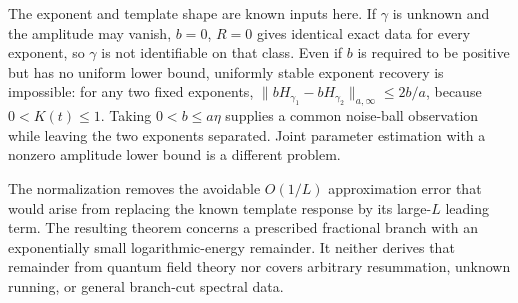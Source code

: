 The exponent and template shape are known inputs here. If $\gamma$ is
unknown and the amplitude may vanish, $b=0$, $R=0$ gives identical exact
data for every exponent, so $\gamma$ is not identifiable on that class.
Even if $b$ is required to be positive but has no uniform lower bound,
uniformly stable exponent recovery is impossible: for any two fixed
exponents, $\|bH_{\gamma_1}-bH_{\gamma_2}\|_{a,\infty}\le2b/a$,
because $0<K(t)\le1$. Taking $0<b\le a\eta$ supplies a common
noise-ball observation while leaving the two exponents separated.
Joint parameter estimation with a nonzero amplitude lower bound is a
different problem.

The normalization removes the avoidable $O(1/L)$ approximation error that
would arise from replacing the known template response by its large-$L$
leading term. The resulting theorem concerns a prescribed fractional branch
with an exponentially small logarithmic-energy remainder. It neither derives
that remainder from quantum field theory nor covers arbitrary resummation,
unknown running, or general branch-cut spectral data.
